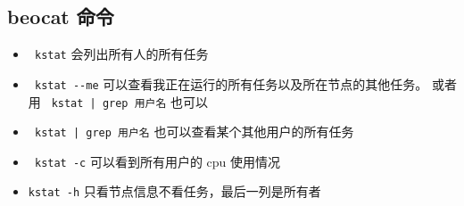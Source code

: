 \subsection{beocat 命令}
\begin{itemize}
\item \verb` kstat` 会列出所有人的所有任务
\item \verb` kstat --me` 可以查看我正在运行的所有任务以及所在节点的其他任务。 或者用 \verb` kstat | grep 用户名` 也可以
\item \verb` kstat | grep 用户名` 也可以查看某个其他用户的所有任务
\item \verb` kstat -c` 可以看到所有用户的 cpu 使用情况
\item \verb`kstat -h` 只看节点信息不看任务，最后一列是所有者
\end{itemize}
